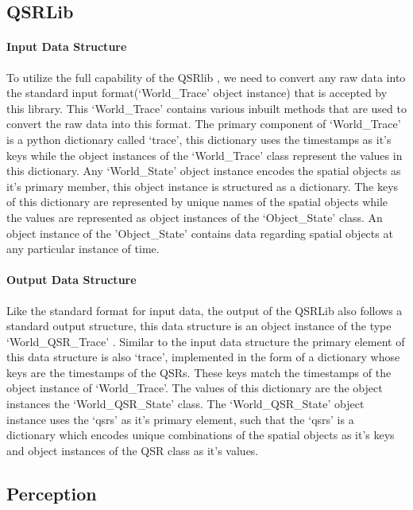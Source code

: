 \subsection{QSRLib}

\paragraph{Input Data Structure}To utilize the full capability of the QSRlib \cite{qsrlib}, we need to convert any raw data into the standard input format(`World\_Trace' object instance) that is accepted by this library. This `World\_Trace' \cite{qsrlib} contains various inbuilt methods that are used to convert the raw data into this format. The primary component of `World\_Trace' is a python dictionary called `trace', this dictionary uses the timestamps as it's keys while the object instances of the `World\_Trace' class represent the values in this dictionary. Any `World\_State' object instance encodes the spatial objects as it's primary member, this object instance is structured as a dictionary. The keys of this dictionary are represented by unique names of the spatial objects while the values are represented as object instances of the `Object\_State' \cite{qsrlib} class. An object instance of the 'Object\_State' contains data regarding spatial objects at any particular instance of time.

\paragraph{Output Data Structure}Like the standard format for input data, the output of the QSRLib also follows a standard output structure, this data structure is an object instance of the type `World\_QSR\_Trace' \cite{qsrlib}. Similar to the input data structure the primary element of this data structure is also `trace', implemented in the form of a dictionary whose keys are the timestamps of the QSRs. These keys match the timestamps of the object instance of `World\_Trace'. The values of this dictionary are the object instances the `World\_QSR\_State' class. The `World\_QSR\_State' object instance uses the `qsrs' as it's primary element, such that the `qsrs' is a dictionary which encodes unique combinations of the spatial objects as it's keys and object instances of the QSR class as it's values.
\subsection{Perception}
